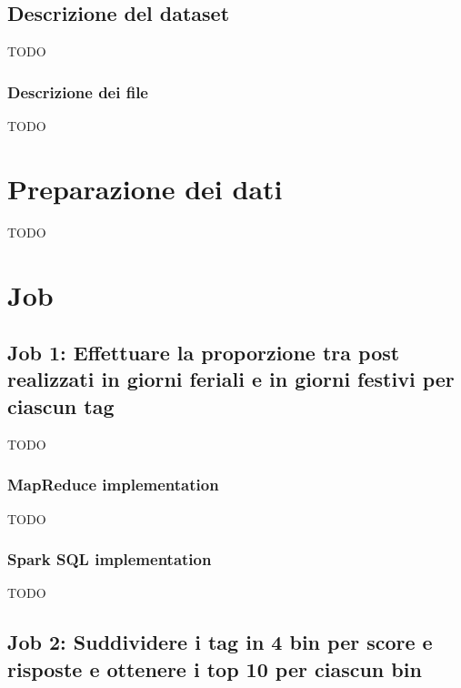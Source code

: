   \subsection{Descrizione del dataset}\label{subsec:dataset}

  TODO

  \subsubsection{Descrizione dei file}\label{subsub:dataset:files}

  TODO

  \section{Preparazione dei dati}\label{sec:preparation}

  TODO

  \section{Job}\label{sec:job}

  \subsection[%
    Job 1: Proporzione giorni feriali/festivi per tag%
  ]{%
    Job 1: Effettuare la proporzione tra post realizzati in giorni feriali e in giorni festivi per ciascun tag%
  }\label{subsec:job1}

  TODO

  \subsubsection{MapReduce implementation}\label{subsub:job1:mapreduce}

  TODO

  \subsubsection{Spark SQL implementation}\label{subsub:job1:spark}

  TODO

  \subsection[%
    Job 2: Suddividere tag in base a score e risposte%
  ]{%
    Job 2: Suddividere i tag in 4 bin per score e risposte e ottenere i top 10 per ciascun bin%
  }\label{subsec:job2}


